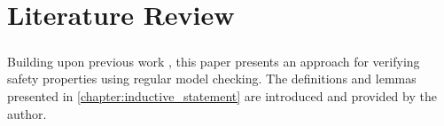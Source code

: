 \chapter{Literature Review}\label{chapter:literature_review}

\paragraph{}
Building upon previous work \cite*{Welzel2023InductiveSts},
this paper presents an approach for verifying safety properties using regular model checking.
The definitions and lemmas presented in \autoref{chapter:inductive_statement} are introduced and provided by the author.
